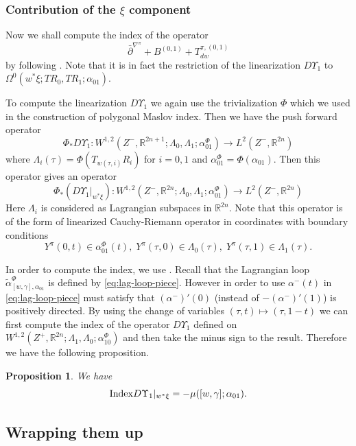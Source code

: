\documentclass[reqno]{amsart}
\def\R{\ifmmode{\mathbb R}\else{$\mathbb R$}\fi} %
\theoremstyle{theorem}
\newtheorem{prop}[thm]{Proposition}
\theoremstyle{definition}
\numberwithin{equation}{section}
\def\R{{\mathbb R}}
\def\R{{\mathbb R}}
\def\R{\ifmmode{\mathbb R}\else{$\mathbb R$}\fi} %
\def\R{{\mathbb R}}
\def\R{{\mathbb R}}
\begin{document}
\subsubsection{Contribution of the $\xi$ component}

Now we shall compute the index of the operator
$$
\bar{\partial}^{\nabla^\pi}+B^{(0,1)}+T^{\pi,(0,1)}_{dw}
$$
by following  \cite[Appendix]{oh:cag}. Note that it is in fact the restriction of the linearization $D\Upsilon_1$ to $\Omega^0(w^*\xi;TR_0,TR_1;\alpha_{01})$.

To compute the linearization $D\Upsilon_1$ we again use the trivialization $\Phi$ which
we used in the construction of polygonal Maslov index.
Then we have the push forward operator
$$\Phi_\ast D\Upsilon_1:W^{1,2}(Z^-,\R^{2n+1};\Lambda_0,\Lambda_1;\alpha^\Phi_{01}) \rightarrow L^2(Z^-,\R^{2n})$$
where $\Lambda_i(\tau) = \Phi(T_{w(\tau,i)}R_i)$ for $i=0,1$ and $\alpha^\Phi_{01} = \Phi(\alpha_{01})$.
Then this operator gives an operator
$$
\Phi_\ast(D\Upsilon_1|_{w^*\xi}):W^{1,2}(Z^-,\R^{2n};\Lambda_0,\Lambda_1;\alpha^\Phi_{01}) \rightarrow L^2(Z^-,\R^{2n})
$$
Here $\Lambda_i$ is considered as Lagrangian subspaces in $\R^{2n}$. Note that this operator is of the form of linearized Cauchy-Riemann operator in coordinates with boundary conditions
$$
Y^\pi(0,t)\in \alpha^\Phi_{01}(t), \; Y^\pi(\tau,0)\in \Lambda_0(\tau), \; Y^\pi(\tau,1)\in \Lambda_1(\tau).
$$

In order to compute the index, we use \cite[Proposition 6.3]{fooo:anchored}. Recall that the Lagrangian loop $\widetilde{\alpha}^\Phi_{[w,\gamma],\alpha_{01}}$ is defined by \eqref{eq:lag-loop-piece}. However in order to use \cite[Proposition 6.3]{fooo:anchored} $\alpha^-(t)$ in \eqref{eq:lag-loop-piece} must satisfy that $(\alpha^-)'(0)$ (instead of $-(\alpha^-)'(1)$) is positively directed. By using the change of variables $(\tau,t) \mapsto (\tau,1-t)$ we can first compute the index of the operator $D\Upsilon_1$ defined on
$W^{1,2}(Z^+,\R^{2n};\Lambda_1,\Lambda_0;\alpha^\Phi_{10})$ and then take the minus sign to the result.
Therefore we have the following proposition.

\begin{prop}
We have
$$ {\rm Index }D\Upsilon_1|_{w^*\xi} = -\mu([w,\gamma];\alpha_{01}). $$
\end{prop}

\subsection{Wrapping them up}
\end{document}
